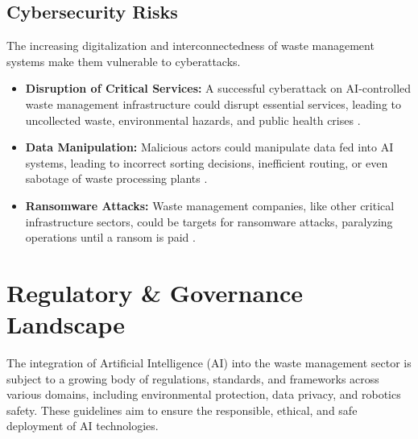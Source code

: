 \subsection{Cybersecurity Risks}
The increasing digitalization and interconnectedness of waste management systems make them vulnerable to cyberattacks.
\begin{itemize}
    \item \textbf{Disruption of Critical Services:} A successful cyberattack on AI-controlled waste management infrastructure could disrupt essential services, leading to uncollected waste, environmental hazards, and public health crises \cite{WasteManaged_Risks}.
    \item \textbf{Data Manipulation:}
Malicious actors could manipulate data fed into AI systems, leading to incorrect sorting decisions, inefficient routing, or even sabotage of waste processing plants \cite{Neuroject_Risks}.
\item \textbf{Ransomware Attacks:}
Waste management companies, like other critical infrastructure sectors, could be targets for ransomware attacks, paralyzing operations until a ransom is paid \cite{WasteManaged_Risks}.
\end{itemize}

\section{Regulatory \& Governance Landscape}

The integration of Artificial Intelligence (AI) into the waste management sector is subject to a growing body of regulations, standards, and frameworks across various domains, including environmental protection, data privacy, and robotics safety. These guidelines aim to ensure the responsible, ethical, and safe deployment of AI technologies.

